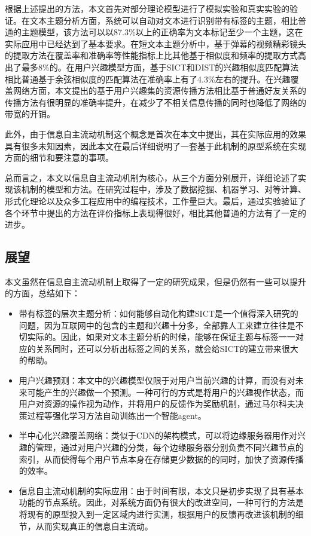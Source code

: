 根据上述提出的方法，本文首先对部分理论模型进行了模拟实验和真实实验的验证。在文本主题分析方面，系统可以自动对文本进行识别带有标签的主题，相比普通的主题模型，该方法可以以87.3\%以上的正确率为文本标记至少一个主题，这在实际应用中已经达到了基本要求。在短文本主题分析中，基于弹幕的视频精彩镜头的提取方法在覆盖率和准确率等性能指标上比其他基于相似度和频率的提取方式高出了最多8\%的。在用户兴趣模型方面，基于SICT和DIST的兴趣相似度匹配算法相比普通基于余弦相似度的匹配算法在准确率上有了4.3\%左右的提升。在兴趣覆盖网络方面，本文提出的基于用户兴趣集的资源传播方法相比基于普通好友关系的传播方法有很明显的准确率提升，在减少了不相关信息传播的同时也降低了网络的带宽的开销。

此外，由于信息自主流动机制这个概念是首次在本文中提出，其在实际应用的效果具有很多未知因素，因此本文在最后详细说明了一套基于此机制的原型系统在实现方面的细节和要注意的事项。

总而言之，本文以信息自主流动机制为核心，从三个方面分别展开，详细论述了实现该机制的模型和方法。在研究过程中，涉及了数据挖掘、机器学习、对等计算、形式化理论以及众多工程应用中的编程技术，工作量巨大。最后，通过实验验证了各个环节中提出的方法在评价指标上表现得很好，相比其他普通的方法有了一定的进步。

\subsection{展望}
本文虽然在信息自主流动机制上取得了一定的研究成果，但是仍然有一些可以提升的方面，总结如下：
\begin{itemize}
  \item 带有标签的层次主题分析：如何能够自动化构建SICT是一个值得深入研究的问题，因为互联网中的包含的主题和兴趣十分多，全部靠人工来建立往往是不切实际的。因此，如果对文本主题分析的时候，能够在保证主题与标签一一对应的关系同时，还可以分析出标签之间的关系，就会给SICT的建立带来很大的帮助。
  \item 用户兴趣预测：本文中的兴趣模型仅限于对用户当前兴趣的计算，而没有对未来可能产生的兴趣做一个预测。一种可行的方式是将用户的兴趣视作状态，而用户对资源的操作视为动作，并将用户的反馈作为奖励机制，通过马尔科夫决策过程等强化学习方法自动训练出一个智能agent。
  \item 半中心化兴趣覆盖网络：类似于CDN的架构模式，可以将边缘服务器用作对兴趣的管理，通过对用户兴趣的分类，每个边缘服务器分别负责不同兴趣节点的索引，从而使得每个用户节点本身在存储更少数据的的同时，加快了资源传播的效率。
  \item 信息自主流动机制的实际应用：由于时间有限，本文只是初步实现了具有基本功能的节点系统。因此，对系统方面仍有很大的改进空间，一种可行的方法是将现有的原型投入到一定区域内进行实测，根据用户的反馈再改进该机制的细节，从而实现真正的信息自主流动。
\end{itemize}

